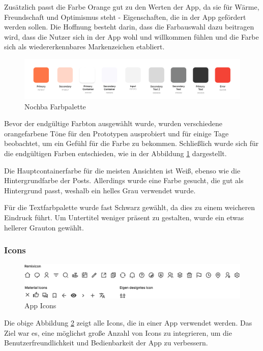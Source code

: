 Zusätzlich passt die Farbe Orange gut zu den Werten der App, da sie für Wärme, Freundschaft und Optimismus steht - Eigenschaften, die in der App gefördert werden sollen. Die Hoffnung besteht darin, dass die Farbauswahl dazu beitragen wird, dass die Nutzer sich in der App wohl und willkommen fühlen und die Farbe sich als wiedererkennbares Markenzeichen etabliert.


\begin{figure}[H]
  \centering
  \includegraphics[width=1\textwidth]{pics/colors.png}
  \caption{Nochba Farbpalette}
  \label{fig:color-chart}
\end{figure}

Bevor der endgültige Farbton ausgewählt wurde, wurden verschiedene orangefarbene Töne für den Prototypen ausprobiert und für einige Tage beobachtet, um ein Gefühl für die Farbe zu bekommen. Schließlich wurde sich für die endgültigen Farben entschieden, wie in der Abbildung \ref{fig:color-chart} dargestellt.

Die Hauptcontainerfarbe für die meisten Ansichten ist Weiß, ebenso wie die Hintergrundfarbe der Posts. Allerdings wurde eine Farbe gesucht, die gut als Hintergrund passt, weshalb ein helles Grau verwendet wurde.

Für die Textfarbpalette wurde fast Schwarz gewählt, da dies zu einem weicheren Eindruck führt. Um Untertitel weniger präsent zu gestalten, wurde ein etwas hellerer Grauton gewählt.


\subsubsection{Icons}


\begin{figure}[ht]
  \centering
  \includegraphics[width=1\textwidth]{pics/icons.png}
  \caption{App Icons}
  \label{fig:app-icons}
\end{figure}

Die obige Abbildung \ref{fig:app-icons} zeigt alle Icons,
die in einer App verwendet werden. Das Ziel war es, eine
möglichst große Anzahl von Icons zu integrieren, um die
Benutzerfreundlichkeit und Bedienbarkeit der App zu
verbessern.

